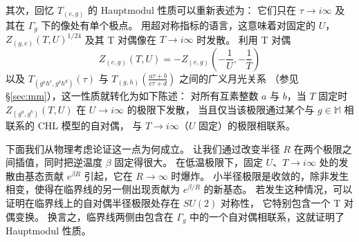 \documentclass[11pt,a4paper,fontset=windows]{ctexart}
\numberwithin{equation}{section}
\newcommand{\SL}{\operatorname{\textsl{SL}}}      %
\newcommand{\RR}{\mathbb{R}}
\newcommand{\MM}{\mathbb{M}}
\begin{document}

其次，回忆 $T_{(e,g)}$ 的 Hauptmodul 性质可以重新表述为：
它们只在 $\tau\rightarrow i\infty$ 及其在 $\Gamma_g$ 下的像处有单个极点。
用超对称指标的语言，这意味着对固定的 $U$，$Z_{(g,e)}(T,U)^{1/24}$ 及其 T 对偶像在 $T\rightarrow i\infty$ 时发散。
利用 T 对偶
\[
Z_{(e,g)}(T,U)=-Z_{(e,g)}\left(-\frac{1}{U},-\frac{1}{T}\right)
\]
以及 $T_{(g^ah^c,g^bh^d)}(\tau)$ 与 $T_{(g,h)}\left(\frac{a\tau+b}{c\tau+d}\right)$ 之间的广义月光关系
（参见 \S\ref{sec:mm}），这一性质就转化为如下陈述：
对所有互素整数 $a$ 与 $b$，当 $T$ 固定时 $Z_{(g^a,g^b)}(T,U)$ 在 $U\to i\infty$ 的极限下发散，
当且仅当该极限通过某个与 $g\in \MM$ 相联系的 CHL 模型的自对偶，
与 $T\to i\infty$（$U$ 固定）的极限相联系。


下面我们从物理考虑论证这一点为何成立。
让我们通过改变半径 $R$ 在两个极限之间插值，同时把逆温度 $\beta$ 固定得很大。
在低温极限下，固定 $U$、$T\to i\infty$ 处的发散由基态贡献 $e^{\beta R}$ 引起，它在 $R\to \infty$ 时爆炸。
小半径极限是收敛的，除非发生相变，使得在临界线的另一侧出现贡献为 $e^{\beta / R}$ 的新基态。
若发生这种情况，可以证明在临界线上的自对偶半径极限处存在 $SU(2)$ 对称性，
它特别包含一个 T 对偶变换。
换言之，临界线两侧由包含在 $\Gamma_g$ 中的一个自对偶相联系，这就证明了 Hauptmodul 性质。


\end{document}
